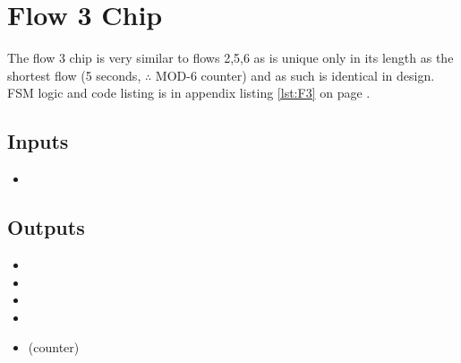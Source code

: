 \section{Flow 3 Chip}
The flow 3 chip is very similar to flows 2,5,6 as is unique only in its length
as the shortest flow (5 seconds, $\therefore$ MOD-6 counter) and as such is identical in design. FSM logic
and code listing is in appendix listing \ref{lst:F3} on page
\pageref{lst:F3}.

\subsection{Inputs}
\begin{itemize}
  \item \EN{}
\end{itemize}

\subsection{Outputs}
\begin{itemize}
  \item \FF
  \item \nGr
  \item \nAm
  \item \nRed
  \item \Q{[0\ldots2]} (counter)
\end{itemize}